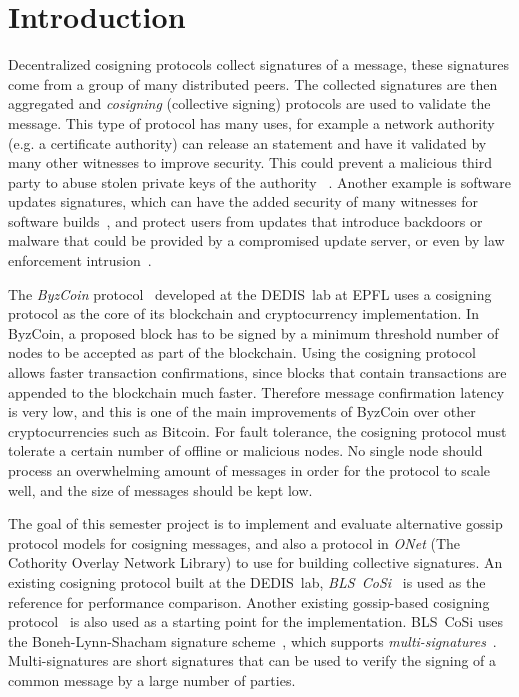 \section{Introduction}

Decentralized cosigning protocols collect signatures of a message, these signatures come from a group of many distributed peers. The collected signatures are then aggregated and 
\emph{cosigning} (collective signing) protocols are used to validate the message.
This type of protocol has many uses, for example a network authority (e.g. a certificate authority) can release an statement and have it validated by many other witnesses to improve security. This could prevent a malicious third party to abuse stolen private keys of the authority ~\cite{Syta16}.
Another example is software updates signatures, which can have the added security of many witnesses for software builds~\cite{Niki17}, and protect users from updates that introduce backdoors or malware that could be provided by a compromised update server, or even by law enforcement intrusion~\cite{Ford16}.

The \emph{\mbox{ByzCoin}} protocol~\cite{Koko16} developed at the DEDIS~lab at EPFL uses a cosigning protocol as the core of its blockchain and cryptocurrency implementation.
In \mbox{ByzCoin}, a proposed block has to be signed by a minimum threshold number of nodes to be accepted as part of the blockchain. Using the cosigning protocol allows faster transaction confirmations, since blocks that contain transactions are appended to the blockchain much faster. Therefore message confirmation latency is very low, and this is one of the main improvements of \mbox{ByzCoin} over other cryptocurrencies such as Bitcoin. For fault tolerance, the cosigning protocol must tolerate a certain number of offline or malicious nodes. No single node should process an overwhelming amount of messages in order for the protocol to scale well, and the size of messages should be kept low.

The goal of this semester project is to implement and evaluate alternative gossip protocol models for cosigning messages, and also a protocol in \emph{ONet} (The Cothority Overlay Network Library) to use for building collective signatures.
An existing cosigning protocol built at the DEDIS~lab, \emph{BLS~CoSi}~\cite{Blscosi} is used as the reference for performance comparison. Another existing gossip-based cosigning protocol~\cite{ProjExisting} is also used as a starting point for the implementation.
BLS~CoSi uses the Boneh-Lynn-Shacham signature scheme~\cite{Boneh01}, which supports \emph{multi-signatures}~\cite{Boneh03}.
Multi-signatures are short signatures that can be used to verify the signing of a common message by a large number of parties.

